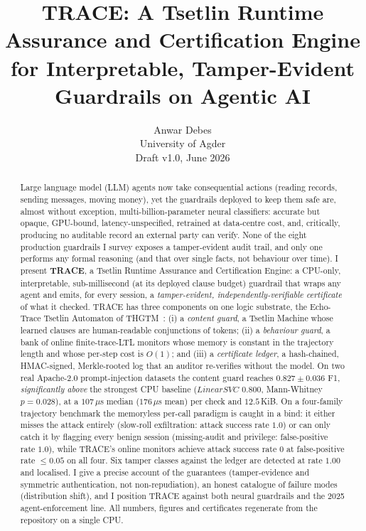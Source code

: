 \documentclass[11pt]{article}
\title{\textbf{TRACE: A Tsetlin Runtime Assurance and Certification Engine\\
for Interpretable, Tamper-Evident Guardrails on Agentic AI}}
\author{Anwar Debes\\
University of Agder\\
\vspace{0.4em}\small Draft v1.0, June 2026}
\date{}
\newcommand{\piTrace}{0.827}\newcommand{\piTraceSd}{0.036}
\newcommand{\piBest}{0.800}\newcommand{\piBestName}{LinearSVC}\newcommand{\piP}{0.028}
\newcommand{\piLat}{176}\newcommand{\piSize}{12.5}
\newcommand{\tamperRate}{1.00}\newcommand{\verifyUs}{933}
\newcommand{\latMed}{107}\newcommand{\latPNN}{428}\newcommand{\latStd}{109}
\begin{document}
\maketitle

\begin{abstract}
Large language model (LLM) agents now take consequential actions (reading
records, sending messages, moving money), yet the guardrails deployed to keep
them safe are, almost without exception, multi-billion-parameter neural
classifiers: accurate but opaque, GPU-bound, latency-unspecified, retrained at
data-centre cost, and, critically, producing no auditable record an external
party can verify. None of the eight production guardrails I survey exposes a
tamper-evident audit trail, and only one performs any formal reasoning (and that
over single facts, not behaviour over time). I present \textbf{TRACE}, a
Tsetlin Runtime Assurance and Certification Engine: a CPU-only, interpretable,
sub-millisecond (at its deployed clause budget) guardrail that wraps any agent
and emits, for every session, a
\emph{tamper-evident, independently-verifiable certificate} of what it checked.
TRACE has three components on one logic substrate, the Echo-Trace Tsetlin
Automaton of THGTM~\citep{debes2026thgtm}: (i) a \emph{content guard}, a Tsetlin
Machine whose learned clauses are human-readable conjunctions of tokens; (ii) a
\emph{behaviour guard}, a bank of online finite-trace-LTL monitors whose memory
is constant in the trajectory length and whose per-step cost is $O(1)$; and
(iii) a \emph{certificate ledger}, a hash-chained, HMAC-signed, Merkle-rooted
log that an auditor re-verifies without the model. On two real Apache-2.0
prompt-injection datasets the content guard reaches $\piTrace\pm\piTraceSd$ F1,
\emph{significantly above} the strongest CPU baseline ($\piBestName$ $\piBest$,
Mann-Whitney $p=\piP$), at a $\latMed\,\mu$s median ($\piLat\,\mu$s mean) per
check and $\piSize$\,KiB. On a
four-family trajectory benchmark the memoryless per-call paradigm is caught in a
bind: it either misses the attack entirely (slow-roll exfiltration: attack
success rate $1.0$) or can only catch it by flagging every benign session
(missing-audit and privilege: false-positive rate $1.0$), while TRACE's online
monitors achieve attack success rate $0$ at false-positive rate $\le 0.05$ on all
four. Six tamper classes against the ledger are detected at rate $\tamperRate$
and localised. I give a precise account of the guarantees (tamper-evidence and
symmetric authentication, not non-repudiation), an honest catalogue of failure
modes (distribution shift), and I position TRACE against both neural guardrails
and the 2025 agent-enforcement line. All numbers, figures
and certificates regenerate from the repository on a single CPU.
\end{abstract}
\end{document}
